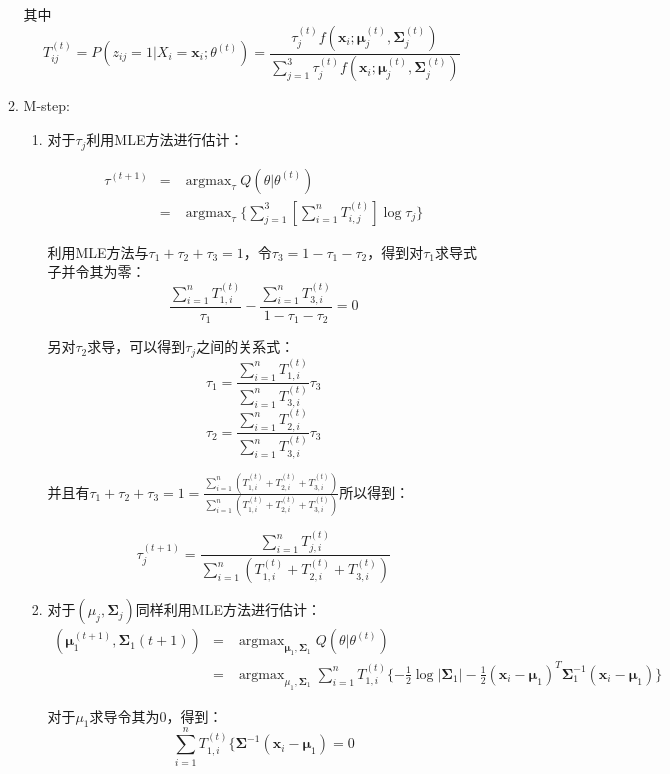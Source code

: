 \documentclass{ctexart}
\begin{document}
\begin{enumerate}
\begin{enumerate}
其中
\[
T_{ij}^{(t)} =P(z_{ij}=1|X_i=\bm{x}_i;\theta^{(t)})=\frac{ \tau^{(t)}_j  f( \bm{x}_i;\bm{\mu}_j^{(t)},\bm{\Sigma}_j^{(t)})}{\displaystyle \sum_{j=1}^3\tau^{(t)}_j  f( \bm{x}_i;\bm{\mu}_j^{(t)},\bm{\Sigma}_j^{(t)})}\]

 \item M-step:
 
 \begin{enumerate}
 \item 对于\(\tau_j\)利用MLE方法进行估计：

\begin{eqnarray*}
\tau^{(t+1)} &=& \mathop{\text{arg} \max}_{\tau} Q(\theta|\theta^{(t)}) \\
&=& \mathop{\text{arg} \max}_{\tau} \{ \sum_{j=1}^3  [\sum_{i=1}^n T_{i,j}^{(t)}]\log \tau_j    \}
\end{eqnarray*}

利用MLE方法与\(\tau_1+\tau_2+\tau_3=1\)，令\(\tau_3=1-\tau_1-\tau_2\)，得到对\(\tau_1\)求导式子并令其为零：
\[ \frac{\displaystyle \sum_{i=1}^n T_{1,i}^{(t)}}{\tau_1}-\frac{\displaystyle \sum_{i=1}^n T_{3,i}^{(t)}}{1-\tau_1-\tau_2} =0\]

另对\(\tau_2\)求导，可以得到\(\tau_j\)之间的关系式：
\[
\tau_1= \frac{\displaystyle \sum_{i=1}^n T_{1,i}^{(t)}} {\displaystyle \sum_{i=1}^n T_{3,i}^{(t)}} \tau_3\]
\[
\tau_2= \frac{\displaystyle \sum_{i=1}^n T_{2,i}^{(t)}} {\displaystyle \sum_{i=1}^n T_{3,i}^{(t)}} \tau_3\]

并且有\(\tau_1+\tau_2+\tau_3=1= \frac  {\displaystyle \sum_{i=1}^n (T_{1,i}^{(t)}+T_{2,i}^{(t)}+T_{3,i}^{(t)})}
 {\displaystyle \sum_{i=1}^n (T_{1,i}^{(t)}+T_{2,i}^{(t)}+T_{3,i}^{(t)})}
\)所以得到：

\[ \tau_j^{(t+1)}= \frac {\displaystyle \sum_{i=1}^n T_{j,i}^{(t)}} {\displaystyle \sum_{i=1}^n (T_{1,i}^{(t)}+T_{2,i}^{(t)}+T_{3,i}^{(t)})}
\]

\item
对于\((\mu_j,\bm{\Sigma}_j)\)同样利用MLE方法进行估计：
\begin{eqnarray*}
(\bm{\mu}_1^{(t+1)},\bm{\Sigma}_1{(t+1)}) &=& \mathop{\text{arg} \max}_{\bm{\mu}_1,\bm{\Sigma}_1} Q(\theta | \theta^{(t)}) \\
&=& \mathop{\text{arg} \max}_{\mu_1,\bm{\Sigma}_1}  \sum_{i=1}^n T_{1,i}^{(t)} \{ -\frac{1}{2} \log |\bm{\Sigma}_1| -\frac{1}{2} (\bm{x}_i-\bm{\mu}_1)^T\bm{\Sigma}_1^{-1}  (\bm{x}_i -\bm{\mu}_1) \}
\end{eqnarray*}

对于\(\mu_1\)求导令其为0，得到：
\[\sum_{i=1}^n T_{1,i}^{(t)} \{ \bm{\Sigma}^{-1}(\bm{x}_i-\bm{\mu}_1)=0\]


\end{enumerate}
\end{enumerate}
\end{enumerate}
\end{document}
